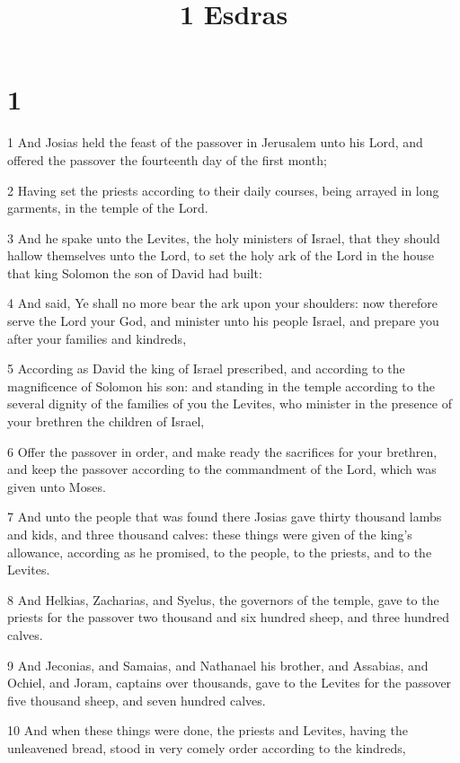

\title{1 Esdras}


\chapter{1}

\par 1 And Josias held the feast of the passover in Jerusalem unto his Lord, and offered the passover the fourteenth day of the first month;
\par 2 Having set the priests according to their daily courses, being arrayed in long garments, in the temple of the Lord.
\par 3 And he spake unto the Levites, the holy ministers of Israel, that they should hallow themselves unto the Lord, to set the holy ark of the Lord in the house that king Solomon the son of David had built:
\par 4 And said, Ye shall no more bear the ark upon your shoulders: now therefore serve the Lord your God, and minister unto his people Israel, and prepare you after your families and kindreds,
\par 5 According as David the king of Israel prescribed, and according to the magnificence of Solomon his son: and standing in the temple according to the several dignity of the families of you the Levites, who minister in the presence of your brethren the children of Israel,
\par 6 Offer the passover in order, and make ready the sacrifices for your brethren, and keep the passover according to the commandment of the Lord, which was given unto Moses.
\par 7 And unto the people that was found there Josias gave thirty thousand lambs and kids, and three thousand calves: these things were given of the king's allowance, according as he promised, to the people, to the priests, and to the Levites.
\par 8 And Helkias, Zacharias, and Syelus, the governors of the temple, gave to the priests for the passover two thousand and six hundred sheep, and three hundred calves.
\par 9 And Jeconias, and Samaias, and Nathanael his brother, and Assabias, and Ochiel, and Joram, captains over thousands, gave to the Levites for the passover five thousand sheep, and seven hundred calves.
\par 10 And when these things were done, the priests and Levites, having the unleavened bread, stood in very comely order according to the kindreds,
